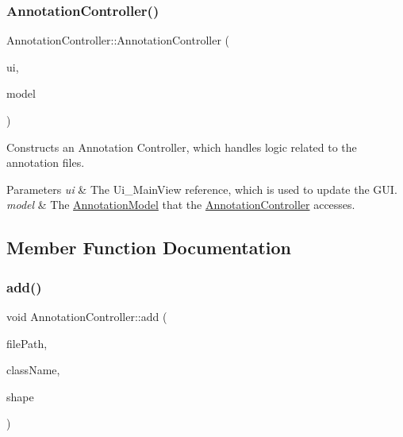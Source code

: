 \subsubsection{\texorpdfstring{Annotation\+Controller()}{AnnotationController()}}
{\footnotesize\ttfamily Annotation\+Controller\+::\+Annotation\+Controller (\begin{DoxyParamCaption}\item[{const Ui\+\_\+\+Main\+View \&}]{ui,  }\item[{const \hyperlink{classAnnotationModel}{Annotation\+Model} \&}]{model }\end{DoxyParamCaption})}



Constructs an Annotation Controller, which handles logic related to the annotation files. 


\begin{DoxyParams}{Parameters}
{\em ui} & The Ui\+\_\+\+Main\+View reference, which is used to update the G\+UI. \\
\hline
{\em model} & The \hyperlink{classAnnotationModel}{Annotation\+Model} that the \hyperlink{classAnnotationController}{Annotation\+Controller} accesses. \\
\hline
\end{DoxyParams}


\subsection{Member Function Documentation}
\mbox{\label{classAnnotationController_a4b9763e234bcf1a85acd0601a572c245}} 
\subsubsection{\texorpdfstring{add()}{add()}}
{\footnotesize\ttfamily void Annotation\+Controller\+::add (\begin{DoxyParamCaption}\item[{const Q\+String \&}]{file\+Path,  }\item[{const Q\+String \&}]{class\+Name,  }\item[{\hyperlink{classLinkedList}{Linked\+List}$<$ Q\+Pair$<$ int, int $>$$>$}]{shape }\end{DoxyParamCaption})}



